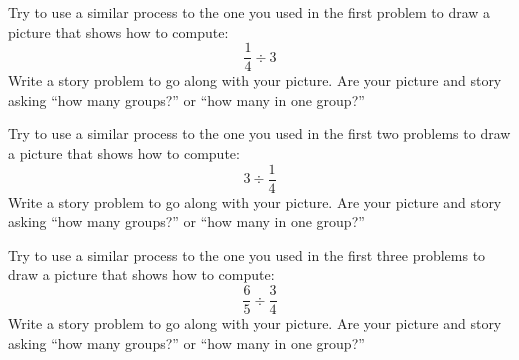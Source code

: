 \documentclass[nooutcomes]{ximera}
\begin{document}
\begin{problem}
Try to use a similar process to the one you used in the first problem
to draw a picture that shows how to compute:
\[
\frac{1}{4} \div 3
\]
Write a story problem to go along with your picture.  Are your picture and story asking ``how many groups?'' or ``how many in
one group?''
\vspace{2in}
\end{problem}

\newpage
\begin{problem}
Try to use a similar process to the one you used in the first two problems
to draw a picture that shows how to compute:
\[
3 \div \frac{1}{4}
\]
Write a story problem to go along with your picture.  Are your picture and story asking ``how many groups?'' or ``how many in
one group?''
\vspace{2in}
\end{problem}



\begin{problem}
Try to use a similar process to the one you used in the first three problems
to draw a picture that shows how to compute:
\[
\frac{6}{5} \div \frac{3}{4}
\]
Write a story problem to go along with your picture.  Are your picture and story asking ``how many groups?'' or ``how many in
one group?''
\vspace{2in}
\end{problem}

%
\end{document}
